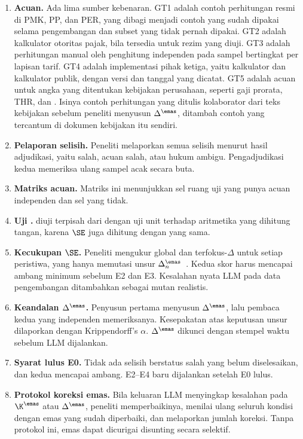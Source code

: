 \begin{enumerate}[leftmargin=*,nosep]
  \item \textbf{Acuan.} Ada lima sumber kebenaran. GT1 adalah contoh perhitungan resmi di PMK, PP, dan PER, yang dibagi menjadi contoh yang sudah dipakai selama pengembangan dan subset  yang tidak pernah dipakai. GT2 adalah kalkulator otoritas pajak, bila tersedia untuk rezim yang diuji. GT3 adalah perhitungan manual oleh penghitung independen pada sampel bertingkat per lapisan tarif. GT4 adalah implementasi pihak ketiga, yaitu kalkulator  dan kalkulator publik, dengan versi dan tanggal yang dicatat. GT5 adalah acuan untuk angka yang ditentukan kebijakan perusahaan, seperti gaji prorata, THR, dan . Isinya contoh perhitungan yang ditulis kolaborator dari teks kebijakan sebelum peneliti menyusun $\Delta^{\emas}$, ditambah contoh yang tercantum di dokumen kebijakan itu sendiri.
  \item \textbf{Pelaporan selisih.} Peneliti melaporkan semua selisih menurut hasil adjudikasi, yaitu  salah, acuan salah, atau hukum ambigu. Pengadjudikasi kedua memeriksa ulang sampel acak secara buta.
  \item \textbf{Matriks acuan.} Matriks ini menunjukkan sel ruang uji yang punya acuan independen dan sel yang tidak.
  \item \textbf{Uji .}  diuji terpisah dari  dengan uji unit terhadap aritmetika yang dihitung tangan, karena $\SE$ juga dihitung dengan  yang sama.
  \item \textbf{Kecukupan $\SE$.} Peneliti mengukur  global dan  terfokus-$\Delta$ untuk setiap peristiwa, yang hanya memutasi unsur $\Delta^{\emas}_n$~\cite{petrovic2021mutation,petrovic2022mutation}. Kedua skor harus mencapai ambang minimum sebelum E2 dan E3. Kesalahan nyata LLM pada data pengembangan ditambahkan sebagai mutan realistis.
  \item \textbf{Keandalan $\Delta^{\emas}$.} Penyusun pertama menyusun $\Delta^{\emas}$, lalu pembaca kedua yang independen memeriksanya. Kesepakatan atas keputusan unsur dilaporkan dengan Krippendorff's $\alpha$. $\Delta^{\emas}$ dikunci dengan stempel waktu sebelum LLM dijalankan.
  \item \textbf{Syarat lulus E0.} Tidak ada selisih berstatus  salah yang belum diselesaikan, dan kedua  mencapai ambang. E2--E4 baru dijalankan setelah E0 lulus.
  \item \textbf{Protokol koreksi emas.} Bila keluaran LLM menyingkap kesalahan pada $\K^{\emas}$ atau $\Delta^{\emas}$, peneliti memperbaikinya, menilai ulang seluruh kondisi dengan emas yang sudah diperbaiki, dan melaporkan jumlah koreksi. Tanpa protokol ini, emas dapat dicurigai disunting secara selektif.
\end{enumerate}

